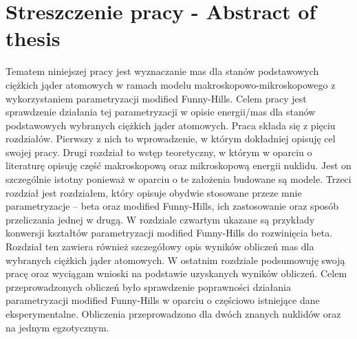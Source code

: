 \documentclass[a4paper,polish]{article}
\numberwithin{equation}{section}
\begin{document}



\section{Streszczenie pracy - Abstract of thesis}

Tematem niniejszej pracy jest wyznaczanie mas dla stanów podstawowych ciężkich jąder atomowych w ramach modelu makroskopowo-mikroskopowego z wykorzystaniem parametryzacji modified Funny-Hills. Celem pracy jest sprawdzenie działania tej parametryzacji w opisie energii/mas dla stanów podstawowych wybranych ciężkich jąder atomowych. Praca składa się z pięciu rozdziałów. Pierwszy z nich to wprowadzenie, w którym dokładniej opisuję cel swojej pracy. Drugi rozdział to wstęp teoretyczny, w którym w oparciu o literaturę opisuję część makroskopową oraz mikroskopową energii nuklidu. Jest on szczególnie istotny ponieważ w oparciu o te założenia budowane są modele. Trzeci rozdział jest rozdziałem, który opisuje obydwie stosowane przeze mnie parametryzacje – beta oraz modified Funny-Hills, ich zastosowanie oraz sposób przeliczania jednej w drugą. W rozdziale czwartym ukazane są przykłady konwersji kształtów parametryzacji  modified Funny-Hills do rozwinięcia beta. Rozdział ten zawiera również szczegółowy opis wyników obliczeń mas dla wybranych ciężkich jąder atomowych. W ostatnim rozdziale podsumowuję swoją pracę oraz wyciągam wnioski na podstawie uzyskanych wyników obliczeń. Celem przeprowadzonych obliczeń było sprawdzenie poprawności działania parametryzacji modified Funny-Hills w oparciu o częściowo istniejące dane eksperymentalne. Obliczenia przeprowadzono dla dwóch znanych nuklidów oraz na jednym egzotycznym.
\\
\end{document}
